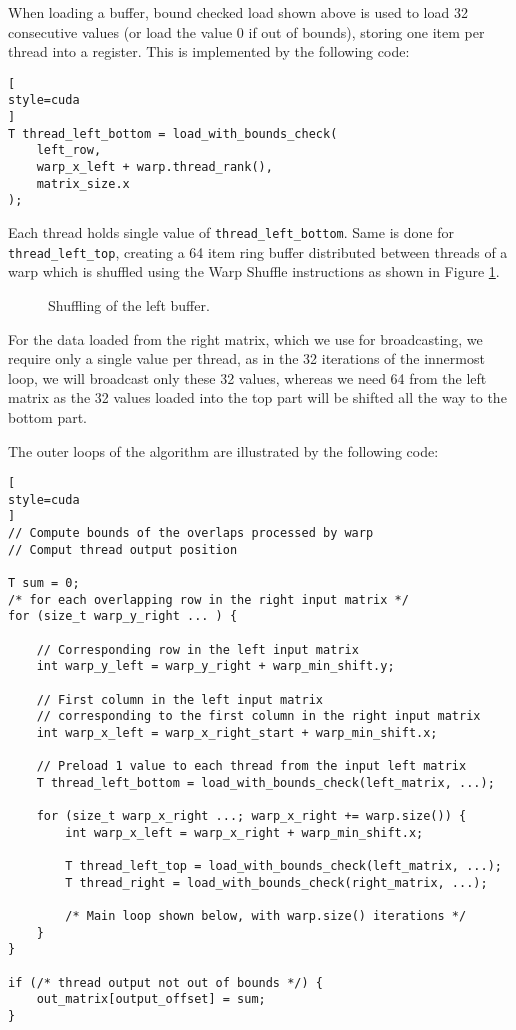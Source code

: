 When loading a buffer, bound checked load shown above is used to load 32 consecutive values (or load the value 0 if out of bounds), storing one item per thread into a register. This is implemented by the following code:
\begin{lstlisting}[
style=cuda
]
T thread_left_bottom = load_with_bounds_check(
	left_row,
	warp_x_left + warp.thread_rank(),
	matrix_size.x
);

\end{lstlisting}

Each thread holds single value of \texttt{thread\_left\_bottom}. Same is done for \texttt{thread\_left\_top}, creating a 64 item ring buffer distributed between threads of a warp which is shuffled using the Warp Shuffle instructions as shown in Figure \ref{fig:shuffle_buffer}.

\begin{figure}[ht]
	\centering
	\def\svgwidth{\textwidth}
	
	\caption{Shuffling of the left buffer.}
	\label{fig:shuffle_buffer}
\end{figure}

For the data loaded from the right matrix, which we use for broadcasting, we require only a single value per thread, as in the 32 iterations of the innermost loop, we will broadcast only these 32 values, whereas we need 64 from the left matrix as the 32 values loaded into the top part will be shifted all the way to the bottom part.

The outer loops of the algorithm are illustrated by the following code:

\begin{lstlisting}[
style=cuda
]
// Compute bounds of the overlaps processed by warp
// Comput thread output position

T sum = 0;
/* for each overlapping row in the right input matrix */
for (size_t warp_y_right ... ) {

	// Corresponding row in the left input matrix
	int warp_y_left = warp_y_right + warp_min_shift.y;
	
	// First column in the left input matrix 
	// corresponding to the first column in the right input matrix
	int warp_x_left = warp_x_right_start + warp_min_shift.x;
	
	// Preload 1 value to each thread from the input left matrix
	T thread_left_bottom = load_with_bounds_check(left_matrix, ...);
	
	for (size_t warp_x_right ...; warp_x_right += warp.size()) {
		int warp_x_left = warp_x_right + warp_min_shift.x;
		
		T thread_left_top = load_with_bounds_check(left_matrix, ...);
		T thread_right = load_with_bounds_check(right_matrix, ...);
		
		/* Main loop shown below, with warp.size() iterations */
	}
}

if (/* thread output not out of bounds */) {
	out_matrix[output_offset] = sum;
}
\end{lstlisting}

